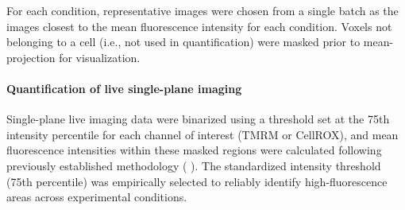 \documentclass[12pt]{article}
\begin{document}
For each condition, representative images were chosen from a single batch as the images closest to the mean fluorescence intensity for each condition. Voxels not belonging to a cell (i.e., not used in quantification) were masked prior to mean-projection for visualization.

\paragraph{Quantification of live single-plane imaging}
Single-plane live imaging data were binarized using a threshold set at the 75th intensity percentile for each channel of interest (TMRM or CellROX), and mean fluorescence intensities within these masked regions were calculated following previously established methodology ( \cite{Esteras2020-md}). The standardized intensity threshold (75th percentile) was empirically selected to reliably identify high-fluorescence areas across experimental conditions.
\end{document}
